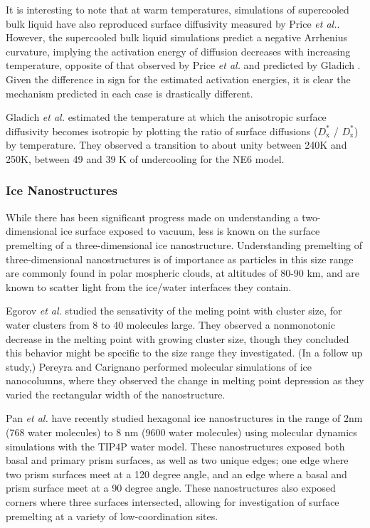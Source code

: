 It is interesting to note that at warm temperatures, simulations of
supercooled bulk liquid\cite{Picaud06,Mahoney01} have also reproduced surface
diffusivity measured by Price \textit{et al.}. However, the
supercooled bulk liquid simulations predict a negative Arrhenius
curvature, implying the activation energy of diffusion decreases with
increasing temperature, opposite of that observed by Price \textit{et
  al.} and predicted by Gladich . Given the difference
in sign for the estimated activation energies, it is clear the
mechanism predicted in each case is drastically different. 

Gladich \textit{et al.} estimated the temperature at which the
anisotropic surface diffusivity becomes isotropic by plotting the
ratio of surface diffusions ($D^{*}_\mathrm{x}$ / $D^{*}_\mathrm{z}$)
by temperature. They observed a transition to about unity between 240K
and 250K, between 49 and 39 K of undercooling for the NE6 model.


\subsubsection{Ice Nanostructures}
While there has been significant progress made on understanding a
two-dimensional ice surface exposed to vacuum, less is known on the
surface premelting of a three-dimensional ice
nanostructure. Understanding premelting of three-dimensional
nanostructures is of importance as particles in this size range are
commonly found in polar mospheric clouds, at altitudes of 80-90 km,
and are known to scatter light from the ice/water interfaces they
contain.\cite{Murray10} 

Egorov \textit{et al.} studied the sensativity of the meling point
with cluster size, for water clusters from 8 to 40 molecules
large.\cite{Egorov02} They observed a nonmonotonic decrease in the melting
point with growing cluster size, though they concluded this behavior
might be specific to the size range they investigated. (In a follow up
study,) Pereyra and Carignano performed molecular simulations of ice
nanocolumns, where they observed the change in melting point
depression as they varied the rectangular width of the
nanostructure.\cite{Pereyra09} 

Pan \textit{et al.} have recently studied hexagonal ice nanostructures
in the range of 2nm (768 water molecules) to 8 nm (9600 water
molecules) using molecular dynamics simulations with the TIP4P water
model.\cite{Pan11} These nanostructures exposed both basal and primary
prism surfaces, as well as two unique edges; one edge where two prism
surfaces meet at a 120 degree angle, and an edge where a basal and
prism surface meet at a 90 degree angle. These nanostructures also
exposed corners where three surfaces intersected, allowing for
investigation of surface premelting at a variety of low-coordination
sites.

